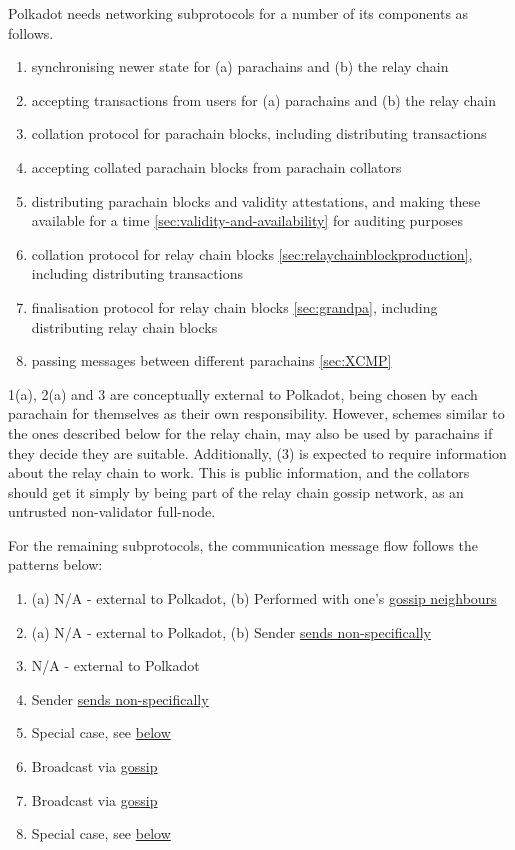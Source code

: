 Polkadot needs networking subprotocols for a number of its components as follows.
\begin{enumerate}
\item synchronising newer state for (a) parachains and (b) the relay chain
\item accepting transactions from users for (a) parachains and (b) the relay chain
\item collation protocol for parachain blocks, including distributing transactions
\item accepting collated parachain blocks from parachain collators
\item distributing parachain blocks and validity attestations, and making these available for a time \ref{sec:validity-and-availability} for auditing purposes
\item collation protocol for relay chain blocks \ref{sec:relaychainblockproduction}, including distributing transactions
\item finalisation protocol for relay chain blocks \ref{sec:grandpa}, including distributing relay chain blocks
\item passing messages between different parachains \ref{sec:XCMP}
\end{enumerate}

1(a), 2(a) and 3 are conceptually external to Polkadot, being chosen by each parachain for themselves as their own responsibility. However, schemes similar to the ones described below for the relay chain, may also be used by parachains if they decide they are suitable. Additionally, (3) is expected to require information about the relay chain to work. This is public information, and the collators should get it simply by being part of the relay chain gossip network, as an untrusted non-validator full-node.

For the remaining subprotocols, the communication message flow follows the patterns below:

\begin{enumerate}
\item (a) N/A - external to Polkadot, (b) Performed with one's \hyperref[sec:gossiping]{gossip neighbours}
\item (a) N/A - external to Polkadot, (b) Sender \hyperref[sec:net_service]{sends non-specifically}
\item N/A - external to Polkadot
\item Sender \hyperref[sec:net_service]{sends non-specifically}
\item Special case, see \hyperref[sec:net_storage]{below}
\item Broadcast via \hyperref[sec:gossiping]{gossip}
\item Broadcast via \hyperref[sec:gossiping]{gossip}
\item Special case, see \hyperref[sec:net_crosschain]{below}
\end{enumerate}

